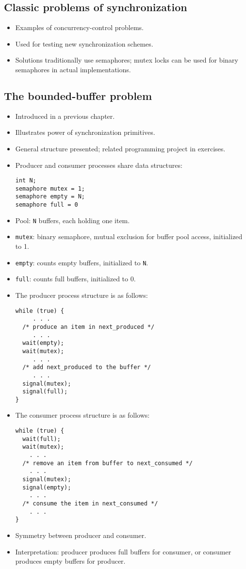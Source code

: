 \subsection{Classic problems of synchronization}
\begin{itemize}
    \item Examples of concurrency-control problems.
    \item Used for testing new synchronization schemes.
    \item Solutions traditionally use semaphores; mutex locks can be used for binary semaphores in actual implementations.
\end{itemize}

\subsection{The bounded-buffer problem}
\begin{itemize}
    \item Introduced in a previous chapter.
    \item Illustrates power of synchronization primitives.
    \item General structure presented; related programming project in exercises.
    \item Producer and consumer processes share data structures:
    \begin{verbatim}
int N;
semaphore mutex = 1;
semaphore empty = N;
semaphore full = 0
\end{verbatim}
    \item Pool: \texttt{N} buffers, each holding one item.
    \item \texttt{mutex}: binary semaphore, mutual exclusion for buffer pool access, initialized to 1.
    \item \texttt{empty}: counts empty buffers, initialized to \texttt{N}.
    \item \texttt{full}: counts full buffers, initialized to 0.
    \item The producer process structure is as follows:
    \begin{verbatim}
while (true) {
     . . .
  /* produce an item in next_produced */
     . . .
  wait(empty);
  wait(mutex);
     . . .
  /* add next_produced to the buffer */
     . . .
  signal(mutex);
  signal(full);
}
    \end{verbatim}
    \item The consumer process structure is as follows:
    \begin{verbatim}
while (true) {
  wait(full);
  wait(mutex);
    . . .
  /* remove an item from buffer to next_consumed */
    . . .
  signal(mutex);
  signal(empty);
    . . .
  /* consume the item in next_consumed */
    . . .
}
    \end{verbatim}
    \item Symmetry between producer and consumer.
    \item Interpretation: producer produces full buffers for consumer, or consumer produces empty buffers for producer.
\end{itemize}

